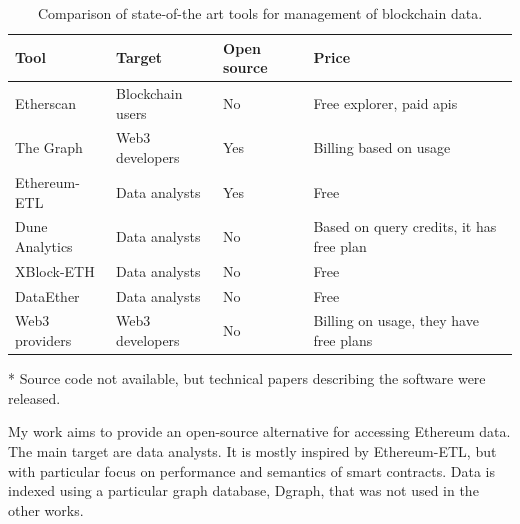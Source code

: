 \begin{table}[ht!]
\centering
    \begin{threeparttable}
    \begin{tabular}  { m{3cm} m{3cm} m{1.5cm} m{5cm} } 
    \toprule
    \textbf{Tool} & \textbf{Target} & \textbf{Open source} & \textbf{Price}  \\
    \midrule
    Etherscan    & Blockchain users  & No & Free explorer, paid apis  \\[2.3ex]
    The Graph     & Web3 developers & Yes & Billing based on usage  \\[1.3ex]
    Ethereum-ETL     & Data analysts & Yes & Free  \\[1.3ex]
    Dune Analytics      & Data analysts & No & Based on query credits, it has free plan \\[2.6ex]
    XBlock-ETH  & Data analysts & No\tnote{*} & Free   \\[1.3ex]
    DataEther  & Data analysts & No\tnote{*} & Free   \\[1.3ex]
    Web3 providers      & Web3 developers & No & Billing on usage, they have free plans   \\[1.6ex]
    \bottomrule
    \end{tabular}
    \begin{tablenotes}
      \item[*] Source code not available, but technical papers describing the software were released.
      \end{tablenotes}
    \end{threeparttable}
\caption[State of the art tools comparison]{Comparison of state-of-the art tools for management of blockchain data.}
\label{table:tools-comparison}
\end{table}

My work aims to provide an open-source alternative for accessing Ethereum data. The main target are data analysts. It is mostly inspired by Ethereum-ETL, but with particular focus on performance and semantics of smart contracts. Data is indexed using a particular graph database, Dgraph, that was not used in the other works.
